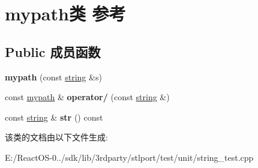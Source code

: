 \hypertarget{classmypath}{}\section{mypath类 参考}
\label{classmypath}
\subsection*{Public 成员函数}
\begin{DoxyCompactItemize}
\item 
\mbox{\label{classmypath_a4e8ff136bb9307df5b95658426b15f78}} 
{\bfseries mypath} (const \hyperlink{structstring}{string} \&s)
\item 
\mbox{\label{classmypath_abbbc8abfded3fd0def9b261d3bfff530}} 
const \hyperlink{classmypath}{mypath} \& {\bfseries operator/} (const \hyperlink{structstring}{string} \&)
\item 
\mbox{\label{classmypath_a859ea0e096f7168a7dbd6cc04a6d882b}} 
const \hyperlink{structstring}{string} \& {\bfseries str} () const
\end{DoxyCompactItemize}


该类的文档由以下文件生成\+:\begin{DoxyCompactItemize}
\item 
E\+:/\+React\+O\+S-\/0../sdk/lib/3rdparty/stlport/test/unit/string\+\_\+test.\+cpp\end{DoxyCompactItemize}
